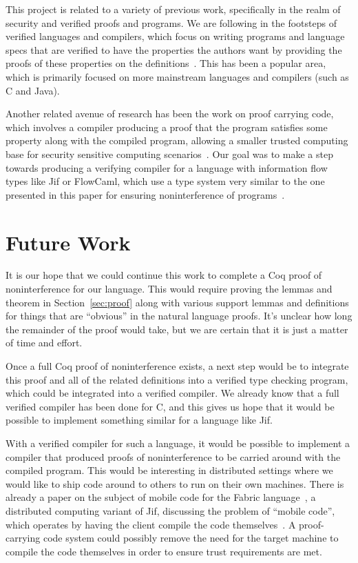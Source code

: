 \documentclass[a4paper,twocolumn]{article}
\theoremstyle{plain}
\theoremstyle{definition}
\begin{document}
This project is related to a variety of previous work, specifically in the realm
of security and verified proofs and programs.  We are following in the footsteps
of verified languages and compilers, which focus on writing programs and
language specs that are verified to have the properties the authors want by
providing the proofs of these properties on the
definitions~\cite{strecker2002formal, leinenbach2005towards, dave2003compiler,
leroy2009formally, leroy2006formal, leroy2009formal, leroy2012compcert,
chlipala2010verified, berghofer2004extracting}.  This has been a popular area,
which is primarily focused on more mainstream languages and compilers (such as C
and Java).

Another related avenue of research has been the work on proof carrying code,
which involves a compiler producing a proof that the program satisfies some
property along with the compiled program, allowing a smaller trusted computing
base for security sensitive computing
scenarios~\cite{necula2002proof,necula1998design}.  Our goal was to make a step
towards producing a verifying compiler for a language with information flow
types like Jif or FlowCaml, which use a type system very similar to the one
presented in this paper for ensuring noninterference of
programs~\cite{InfoFlowML,myers1999jflow}.

\section{Future Work}
\label{sec:future}

It is our hope that we could continue this work to complete a Coq proof of
noninterference for our language.  This would require proving the lemmas and
theorem in Section~\ref{sec:proof} along with various support lemmas and
definitions for things that are ``obvious'' in the natural language proofs.
It's unclear how long the remainder of the proof would take, but we are certain
that it is just a matter of time and effort.

Once a full Coq proof of noninterference exists, a next step would be to
integrate this proof and all of the related definitions into a verified type
checking program, which could be integrated into a verified compiler.  We
already know that a full verified compiler has been done for C, and this gives
us hope that it would be possible to implement something similar for a language
like Jif.

With a verified compiler for such a language, it would be possible to implement
a compiler that produced proofs of noninterference to be carried around with the
compiled program.  This would be interesting in distributed settings where we
would like to ship code around to others to run on their own machines.  There is
already a paper on the subject of mobile code for the Fabric
language~\cite{liu2009fabric}, a distributed computing variant of Jif,
discussing the problem of ``mobile code'', which operates by having the client
compile the code themselves~\cite{arden2012sharing}.  A proof-carrying code
system could possibly remove the need for the target machine to compile the code
themselves in order to ensure trust requirements are met.
\end{document}
